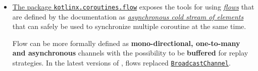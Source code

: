 \begin{itemize}
	\item \underline{The package \href{https://kotlinlang.org/api/kotlinx.coroutines/kotlinx-coroutines-core/kotlinx.coroutines.flow/}{\texttt{kotlinx.coroutines.flow}}} exposes the tools for using \href{https://kotlinlang.org/docs/flow.html}{\textit{flows}} that are defined by the documentation as \href{https://kotlinlang.org/api/kotlinx.coroutines/kotlinx-coroutines-core/kotlinx.coroutines.flow/L}{\textit{asynchronous cold stream of elements}} that can safely be used to synchronize multiple coroutine at the same time.
	
	Flow can be more formally defined as \textbf{mono-directional, one-to-many and asynchronous} channels with the possibility to be \textbf{buffered} for replay strategies. In the latest versions of \Kotlin, flows replaced \href{https://kotlinlang.org/api/kotlinx.coroutines/kotlinx-coroutines-core/kotlinx.coroutines.channels/-broadcast-channel/}{\texttt{BroadcastChannel}}.
\end{itemize}

